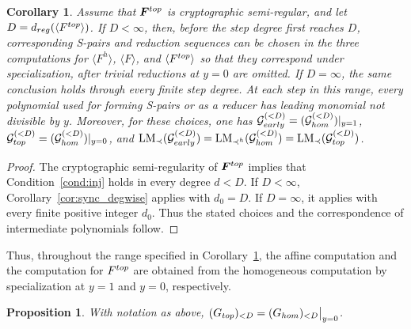 \documentclass{article}
\newtheorem{proposition}[theorem]{Proposition}
\newtheorem{corollary}[theorem]{Corollary}
\theoremstyle{definition}
\theoremstyle{plain}
\theoremstyle{plain}
\theoremstyle{plain}
\theoremstyle{plain}
\numberwithin{equation}{subsection}
\begin{document}
\begin{corollary}\label{cor:sync_csr}
Assume that $\bm F^{\rm top}$ is cryptographic semi-regular, and let $D=d_{\rm reg}(\langle F^{\rm top}\rangle)$.
If $D<\infty$, then, before the step degree first reaches $D$, corresponding S-pairs and reduction sequences can be chosen in the three computations for $\langle F^h\rangle$, $\langle F\rangle$, and $\langle F^{\rm top}\rangle$ so that they correspond under specialization, after trivial reductions at $y=0$ are omitted.
If $D=\infty$, the same conclusion holds through every finite step degree.
At each step in this range, every polynomial used for forming S-pairs or as a reducer has leading monomial not divisible by $y$.
Moreover, for these choices, one has $\mathcal G_{\rm early}^{(<D)}=(\mathcal G_{\rm hom}^{(<D)})|_{y=1}$, $\mathcal G_{\rm top}^{(<D)}=(\mathcal G_{\rm hom}^{(<D)})|_{y=0}$, and $\operatorname{LM}_{\prec}(\mathcal G_{\rm early}^{(<D)})=\operatorname{LM}_{\prec^h}(\mathcal G_{\rm hom}^{(<D)})=\operatorname{LM}_{\prec}(\mathcal G_{\rm top}^{(<D)})$.
\end{corollary}

\begin{proof}
The cryptographic semi-regularity of $\bm{F}^{\rm top}$ implies that Condition~\ref{cond:inj} holds in every degree $d<D$.
If $D<\infty$, Corollary~\ref{cor:sync_degwise} applies with $d_0=D$.
If $D=\infty$, it applies with every finite positive integer $d_0$.
Thus the stated choices and the correspondence of intermediate polynomials follow.
\end{proof}

Thus, throughout the range specified in Corollary~\ref{cor:sync_csr}, the affine computation and the computation for $F^{\rm top}$ are obtained from the homogeneous computation by specialization at $y=1$ and $y=0$, respectively.

\begin{proposition}\label{prop:interreduce-top}
With notation as above, $(G_{\rm top})_{<D}=(G_{\rm hom})_{<D}\big|_{y=0}$.
\end{proposition}
\end{document}

